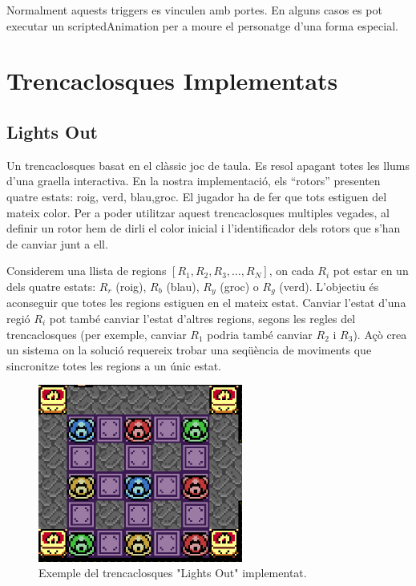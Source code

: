 \documentclass[a4paper,12pt]{article}
\begin{document}
Normalment aquests triggers es vinculen amb portes. En alguns casos es pot executar un scriptedAnimation per a moure el personatge d'una forma especial.

\section{Trencaclosques Implementats}

\subsection{Lights Out}
Un trencaclosques basat en el clàssic joc de taula. Es resol apagant totes les llums d'una graella interactiva. En la nostra implementació, els ``rotors'' presenten quatre estats: roig, verd, blau,groc. El jugador ha de fer que tots estiguen del mateix color. Per a poder utilitzar aquest trencaclosques multiples vegades, al definir un rotor hem de dirli el color inicial i l'identificador dels rotors que s'han de canviar junt a ell.

Considerem una llista de regions $[R_1, R_2, R_3, \ldots, R_N]$, on cada $R_i$ pot estar en un dels quatre estats: $R_r$ (roig), $R_b$ (blau), $R_y$ (groc) o $R_g$ (verd). L'objectiu és aconseguir que totes les regions estiguen en el mateix estat. Canviar l'estat d'una regió $R_i$ pot també canviar l'estat d'altres regions, segons les regles del trencaclosques (per exemple, canviar $R_1$ podria també canviar $R_2$ i $R_3$). Açò crea un sistema on la solució requereix trobar una seqüència de moviments que sincronitze totes les regions a un únic estat.

\begin{figure}[ht!]
    \centering
    \includegraphics[width=0.6\textwidth]{../imgs/exemple-trencaclosques.png}
    \caption{Exemple del trencaclosques "Lights Out" implementat.}
    \label{fig:exemple-trencaclosques}
\end{figure}
\end{document}
